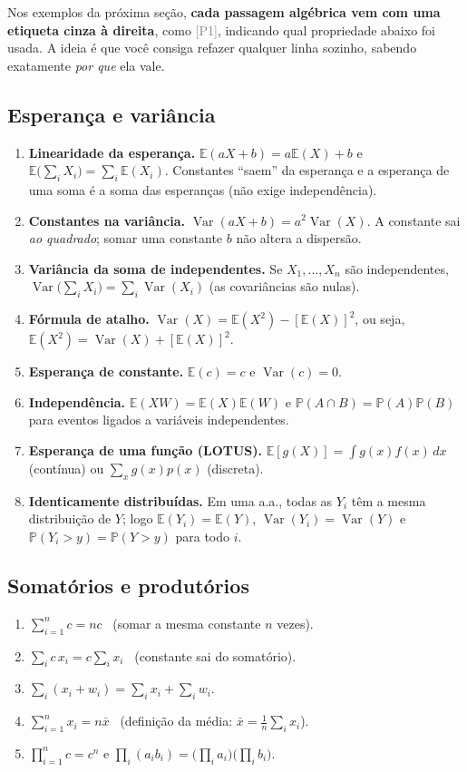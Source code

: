 \documentclass[11pt,a4paper]{article}
\theoremstyle{definition}
\theoremstyle{plain}
\newcommand{\E}{\mathbb{E}}
\newcommand{\Var}{\operatorname{Var}}
\newcommand{\Prob}{\mathbb{P}}
\begin{document}
Nos exemplos da próxima seção, \textbf{cada passagem algébrica vem com uma etiqueta cinza à direita}, como \textcolor{gray}{[P1]}, indicando qual propriedade abaixo foi usada. A ideia é que você consiga refazer qualquer linha sozinho, sabendo exatamente \emph{por que} ela vale.

\subsection*{Esperança e variância}
\begin{enumerate}[label=\textbf{(P\arabic*)},leftmargin=3.2em]
\item \textbf{Linearidade da esperança.} $\E(aX+b)=a\E(X)+b$ e $\E\big(\sum_i X_i\big)=\sum_i\E(X_i)$. Constantes ``saem'' da esperança e a esperança de uma soma é a soma das esperanças (não exige independência).
\item \textbf{Constantes na variância.} $\Var(aX+b)=a^2\Var(X)$. A constante sai \emph{ao quadrado}; somar uma constante $b$ não altera a dispersão.
\item \textbf{Variância da soma de independentes.} Se $X_1,\dots,X_n$ são independentes, $\Var\big(\sum_i X_i\big)=\sum_i\Var(X_i)$ (as covariâncias são nulas).
\item \textbf{Fórmula de atalho.} $\Var(X)=\E(X^2)-[\E(X)]^2$, ou seja, $\E(X^2)=\Var(X)+[\E(X)]^2$.
\item \textbf{Esperança de constante.} $\E(c)=c$ e $\Var(c)=0$.
\item \textbf{Independência.} $\E(XW)=\E(X)\E(W)$ e $\Prob(A\cap B)=\Prob(A)\Prob(B)$ para eventos ligados a variáveis independentes.
\item \textbf{Esperança de uma função (LOTUS).} $\E[g(X)]=\int g(x)f(x)\,dx$ (contínua) ou $\sum_x g(x)p(x)$ (discreta).
\item \textbf{Identicamente distribuídas.} Em uma a.a., todas as $Y_i$ têm a mesma distribuição de $Y$; logo $\E(Y_i)=\E(Y)$, $\Var(Y_i)=\Var(Y)$ e $\Prob(Y_i>y)=\Prob(Y>y)$ para todo $i$.
\end{enumerate}

\subsection*{Somatórios e produtórios}
\begin{enumerate}[label=\textbf{(S\arabic*)},leftmargin=3.2em]
\item $\sum_{i=1}^n c = nc$ \ (somar a mesma constante $n$ vezes).
\item $\sum_i c\,x_i = c\sum_i x_i$ \ (constante sai do somatório).
\item $\sum_i (x_i+w_i)=\sum_i x_i+\sum_i w_i$.
\item $\sum_{i=1}^n x_i = n\bar x$ \ (definição da média: $\bar x=\frac1n\sum_i x_i$).
\item $\prod_{i=1}^n c = c^n$ e $\prod_i (a_ib_i)=\big(\prod_i a_i\big)\big(\prod_i b_i\big)$.
\end{enumerate}
\end{document}
